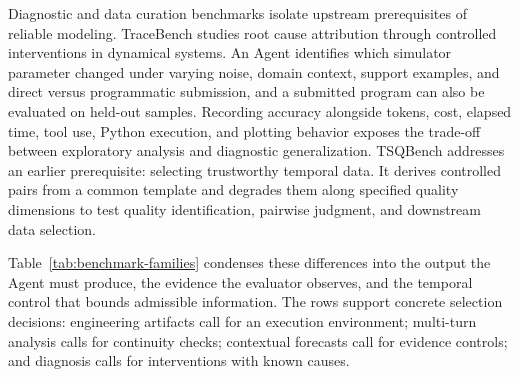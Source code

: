 \documentclass[preprints,article,submit,moreauthors]{Definitions/mdpi}
\begin{document}
Diagnostic and data curation benchmarks isolate upstream prerequisites of reliable modeling. TraceBench \citep{tracebench2026} studies root cause attribution through controlled interventions in dynamical systems. An Agent identifies which simulator parameter changed under varying noise, domain context, support examples, and direct versus programmatic submission, and a submitted program can also be evaluated on held-out samples. Recording accuracy alongside tokens, cost, elapsed time, tool use, Python execution, and plotting behavior exposes the trade-off between exploratory analysis and diagnostic generalization. TSQBench \citep{tsqbench2026} addresses an earlier prerequisite: selecting trustworthy temporal data. It derives controlled pairs from a common template and degrades them along specified quality dimensions to test quality identification, pairwise judgment, and downstream data selection.

Table~\ref{tab:benchmark-families} condenses these differences into the output the Agent must produce, the evidence the evaluator observes, and the temporal control that bounds admissible information. The rows support concrete selection decisions: engineering artifacts call for an execution environment; multi-turn analysis calls for continuity checks; contextual forecasts call for evidence controls; and diagnosis calls for interventions with known causes.
\end{document}
